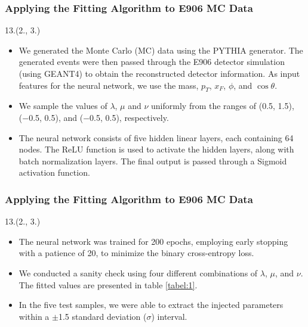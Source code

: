 \documentclass[12pt, xcolor={dvipsnames}, aspectratio = 169, sans,mathserif]{beamer}
\newenvironment{List}[2]
{\begin{textblock}{#1}#2
\begin{itemize}}
{\end{itemize}
\end{textblock}}
\newcommand{\NPcite}[1]{{\tiny \footfullcite{#1}}}
\begin{document}
\begin{frame}
\frametitle{Applying the Fitting Algorithm to E906 MC Data}

\begin{List}{13.}{(2., 3.)}

  \item We generated the Monte Carlo (MC) data using the PYTHIA generator. The generated events were then passed through
  the E906 detector simulation (using GEANT4) to obtain the reconstructed detector information. As input features for the neural network,
  we use the mass, $p_{T}$, $x_{F}$, $\phi$, and $\cos\theta$.

  \item We sample the values of $\lambda$, $\mu$ and $\nu$ uniformly  from the ranges of (0.5, 1.5), (−0.5, 0.5), and
  (−0.5, 0.5), respectively.\NPcite{NuSea:2006gvb}

  \item The neural network consists of five hidden linear layers, each containing 64 nodes. The ReLU function is used
  to activate the hidden layers, along with batch normalization layers. The final output is passed through a Sigmoid activation function.

\end{List}

\end{frame}

\begin{frame}
\frametitle{Applying the Fitting Algorithm to E906 MC Data}

\begin{List}{13.}{(2., 3.)}

  \item The neural network was trained for 200 epochs, employing early stopping with a patience of 20, to minimize the
  binary cross-entropy loss.

  \item We conducted a sanity check using four different combinations of $\lambda$, $\mu$, and $\nu$. The fitted values
  are presented in table \ref{tabel:1}.

  \item In the five test samples, we were able to extract the injected parameters within a $\pm$1.5 standard deviation ($\sigma$) interval.

\end{List}

\end{frame}
\end{document}
